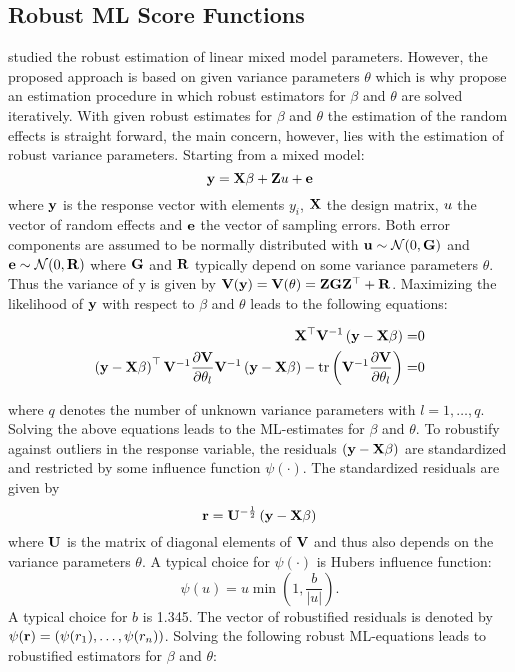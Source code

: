 \subsection{Robust ML Score Functions}\label{robust-ml-score-functions}

\textcite{Fel86} studied the robust estimation of linear mixed model
parameters. However, the proposed approach is based on given variance
parameters $\theta$ which is why \textcite{Sin09} propose an estimation
procedure in which robust estimators for $\beta$ and $\theta$ are solved
iteratively. With given robust estimates for $\beta$ and $\theta$ the
estimation of the random effects is straight forward, the main concern,
however, lies with the estimation of robust variance parameters.
Starting from a mixed model: \[
\mathbf{y} = \mathbf{X} \beta + \mathbf{Z} u + \mathbf{e}
\] where $\mathbf{y}$ is the response vector with elements $y_i$, $\mathbf{X}$
the design matrix, $u$ the vector of random effects and $\mathbf{e}$ the
vector of sampling errors. Both error components are assumed to be
normally distributed with $\mathbf{u} \sim \mathcal{N}(0, \mathbf{G})$ and
$\mathbf{e} \sim \mathcal{N}(0, \mathbf{R})$ where $\mathbf{G}$ and $\mathbf{R}$
typically depend on some variance parameters $\theta$. Thus the variance
of y is given by
$\mathbf{V}(\mathbf{y}) = \mathbf{V}(\theta) = \mathbf{Z}\mathbf{G}\mathbf{Z}^\top + \mathbf{R}$.
Maximizing the likelihood of $\mathbf{y}$ with respect to $\beta$ and
$\theta$ leads to the following equations:

\begin{align*}
\mat{X}^\top\mat{V}^{-1}\left(\mat{y}-\mat{X}\beta\right) =& 0 \\
\left(\mat{y} - \mat{X}\beta\right)^\top\mat{V}^{-1}          %
\frac{\partial\mat{V}}{\partial\theta_l}                      %
\mat{V}^{-1}\left(\mat{y} - \mat{X}\beta\right) -             %
\tr\left(\mat{V}^{-1}\frac{\partial\mat{V}}{\partial\theta_l}\right) =& 0
\end{align*}

where $q$ denotes the number of unknown variance parameters with
$l = 1, \dots, q$. Solving the above equations leads to the ML-estimates
for $\beta$ and $\theta$. To robustify against outliers in the response
variable, the residuals $\left(\mathbf{y}-\mathbf{X}\beta\right)$ are
standardized and restricted by some influence function $\psi(\cdot)$.
The standardized residuals are given by \[
\mathbf{r} = \mathbf{U}^{-\frac{1}{2}}
\left(\mathbf{y}-\mathbf{X}\beta\right)
\] where $\mathbf{U}$ is the matrix of diagonal elements of $\mathbf{V}$ and
thus also depends on the variance parameters $\theta$. A typical choice
for $\psi(\cdot)$ is Hubers influence function: \[
\psi(u) = u \min\left(1, \frac{b}{|u|}\right).
\] A typical choice for $b$ is 1.345. The vector of robustified
residuals is denoted by
$\mathbf{\psi}(\mathbf{r}) = (\psi(r_1), \dots, \psi(r_{n}))$. Solving the
following robust ML-equations leads to robustified estimators for
$\beta$ and $\theta$:


